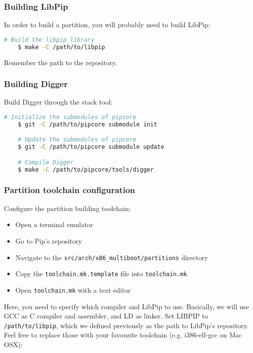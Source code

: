 \documentclass[10pt,a4paper,titlepage]{refart}
\begin{document}
\subsubsection{Building LibPip}

In order to build a partition, you will probably need to build LibPip:

\begin{lstlisting}[language=bash]
    # Build the libpip library
    $ make -C /path/to/libpip
\end{lstlisting}

Remember the path to the repository.

\subsubsection{Building Digger}

Build Digger through the stack tool:

\begin{lstlisting}[language=bash]
    # Initialize the submodules of pipcore
    $ git -C /path/to/pipcore submodule init

    # Update the submodules of pipcore
    $ git -C /path/to/pipcore submodule update

    # Compile Digger
    $ make -C /path/to/pipcore/tools/digger
\end{lstlisting}

\subsubsection{Partition toolchain configuration}

Configure the partition building toolchain:

\begin{itemize}
\item Open a terminal emulator
\item Go to Pip's repository
\item Navigate to the \texttt{src/arch/x86\_multiboot/partitions} directory
\item Copy the \texttt{toolchain.mk.template} file into \texttt{toolchain.mk}
\item Open \texttt{toolchain.mk} with a text editor
\end{itemize}

Here, you need to specify which compiler and LibPip to use. Basically, we will
use GCC as C compiler and assembler, and LD as linker. Set LIBPIP to
\texttt{/path/to/libpip}, which we defined previously as the path to LibPip's
repository. Feel free to replace those with your favourite toolchain (e.g.
i386-elf-gcc on Mac OSX):
\end{document}
